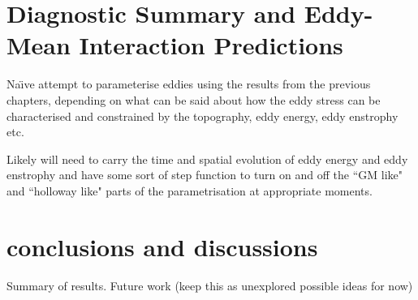 \documentclass[12pt,a4paper]{report}
\begin{document}



\chapter{Diagnostic Summary and Eddy-Mean Interaction Predictions}

Na\"{\i}ve attempt to parameterise eddies using the 
results from the previous chapters, depending
on what can be said about how the eddy stress can
be characterised and constrained by the topography,
eddy energy, eddy enstrophy etc. 

Likely will need to carry the time and spatial
evolution of eddy energy and eddy enstrophy and have
some sort of step function to turn on and off the
``GM like" and ``holloway like" parts of the parametrisation at appropriate moments.


\chapter{conclusions and discussions}

Summary of results.
Future work (keep this as unexplored possible ideas for now)

	 \printbibliography
\end{document}
